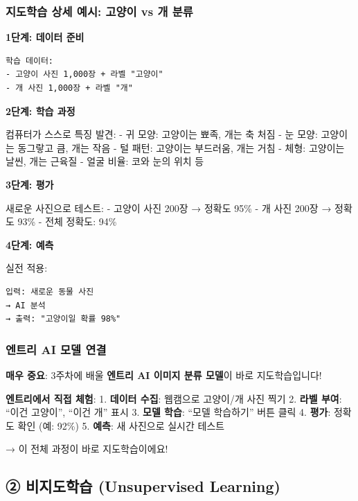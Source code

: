 \documentclass[a4paper, 11pt]{article}
\begin{document}
\hypertarget{uxc9c0uxb3c4uxd559uxc2b5-uxc0c1uxc138-uxc608uxc2dc-uxace0uxc591uxc774-vs-uxac1c-uxbd84uxb958}{%
\subsubsection{지도학습 상세 예시: 고양이 vs 개
분류}\label{uxc9c0uxb3c4uxd559uxc2b5-uxc0c1uxc138-uxc608uxc2dc-uxace0uxc591uxc774-vs-uxac1c-uxbd84uxb958}}

\textbf{1단계: 데이터 준비}

\begin{verbatim}
학습 데이터:
- 고양이 사진 1,000장 + 라벨 "고양이"
- 개 사진 1,000장 + 라벨 "개"
\end{verbatim}

\textbf{2단계: 학습 과정}

컴퓨터가 스스로 특징 발견: - 귀 모양: 고양이는 뾰족, 개는 축 처짐 - 눈
모양: 고양이는 동그랗고 큼, 개는 작음 - 털 패턴: 고양이는 부드러움, 개는
거침 - 체형: 고양이는 날씬, 개는 근육질 - 얼굴 비율: 코와 눈의 위치 등

\textbf{3단계: 평가}

새로운 사진으로 테스트: - 고양이 사진 200장 → 정확도 95\% - 개 사진
200장 → 정확도 93\% - 전체 정확도: 94\%

\textbf{4단계: 예측}

실전 적용:

\begin{verbatim}
입력: 새로운 동물 사진
→ AI 분석
→ 출력: "고양이일 확률 98%"
\end{verbatim}

\hypertarget{uxc5d4uxd2b8uxb9ac-ai-uxbaa8uxb378-uxc5f0uxacb0}{%
\subsubsection{엔트리 AI 모델
연결}\label{uxc5d4uxd2b8uxb9ac-ai-uxbaa8uxb378-uxc5f0uxacb0}}

 \textbf{매우 중요}: 3주차에 배울 \textbf{엔트리 AI 이미지 분류
모델}이 바로 지도학습입니다!

\textbf{엔트리에서 직접 체험}: 1. \textbf{데이터 수집}: 웹캠으로
고양이/개 사진 찍기 2. \textbf{라벨 부여}: ``이건 고양이'', ``이건 개''
표시 3. \textbf{모델 학습}: ``모델 학습하기'' 버튼 클릭 4.
\textbf{평가}: 정확도 확인 (예: 92\%) 5. \textbf{예측}: 새 사진으로
실시간 테스트

→ 이 전체 과정이 바로 지도학습이에요!

\hypertarget{uxbe44uxc9c0uxb3c4uxd559uxc2b5-unsupervised-learning}{%
\subsection{\textbf{②} 비지도학습 (Unsupervised
Learning)}\label{uxbe44uxc9c0uxb3c4uxd559uxc2b5-unsupervised-learning}}
\end{document}
